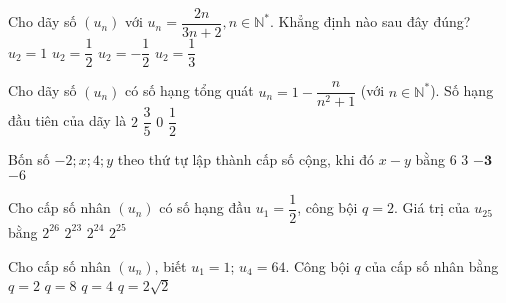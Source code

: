 \begin{ex}%
	Cho dãy số $(u_n)$ với $u_n=\dfrac{2n}{3n+2}, n \in \mathbb{N}^*$. Khẳng định nào sau đây đúng?
	\choice
	{$u_2=1$}
	{\True $u_2=\dfrac{1}{2}$}
	{$u_2=-\dfrac{1}{2}$}
	{$u_2=\dfrac{1}{3}$}
\end{ex}

\begin{ex}%
	Cho dãy số $(u_n)$ có số hạng tổng quát $u_n = 1 - \dfrac{n}{n^2 + 1}$ (với $n \in \mathbb{N}^*$). Số hạng đầu tiên của dãy là
	\choice
	{$2$}
	{$\dfrac{3}{5}$}
	{$0$}
	{\True $\dfrac{1}{2}$}
\end{ex}

\begin{ex}%
	Bốn số $-2; x; 4; y$ theo thứ tự lập thành cấp số cộng, khi đó $x-y$ bằng
	\choice
	{$6$}
	{$3$}
	{$\mathbf{-3}$}
	{$-6$}
\end{ex}

\begin{ex}%
	Cho cấp số nhân $(u_{n})$ có số hạng đầu $u_{1}=\dfrac{1}{2}$, công bội $q=2$. Giá trị của $u_{25}$ bằng
	\choice
	{$2^{26}$}
	{\True $2^{23}$}
	{$2^{24}$}
	{$2^{25}$}
\end{ex}

%

\begin{ex}%
	Cho cấp số nhân $(u_n)$, biết $u_1=1$; $u_4=64$. Công bội $q$ của cấp số nhân bằng
	\choice
	{$q=2$}
	{$q=8$}
	{\True $q=4$}
	{$q=2\sqrt{2}$}
\end{ex}

